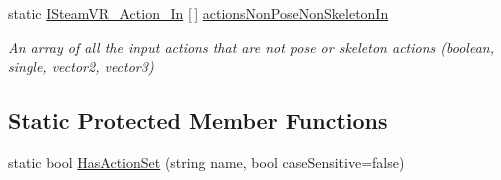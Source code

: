 \begin{DoxyCompactItemize}
static \mbox{\hyperlink{interface_valve_1_1_v_r_1_1_i_steam_v_r___action___in}{I\+Steam\+V\+R\+\_\+\+Action\+\_\+\+In}} \mbox{[}$\,$\mbox{]} \mbox{\hyperlink{class_valve_1_1_v_r_1_1_steam_v_r___input_ad0f4a157c015d646f1239070f12cd565}{actions\+Non\+Pose\+Non\+Skeleton\+In}}
\begin{DoxyCompactList}\small\item\em An array of all the input actions that are not pose or skeleton actions (boolean, single, vector2, vector3) \end{DoxyCompactList}\end{DoxyCompactItemize}
\subsection*{Static Protected Member Functions}
\begin{DoxyCompactItemize}
\item 
static bool \mbox{\hyperlink{class_valve_1_1_v_r_1_1_steam_v_r___input_a9d83c5f21feffcfa97e519178b01339e}{Has\+Action\+Set}} (string name, bool case\+Sensitive=false)
\end{DoxyCompactItemize}
